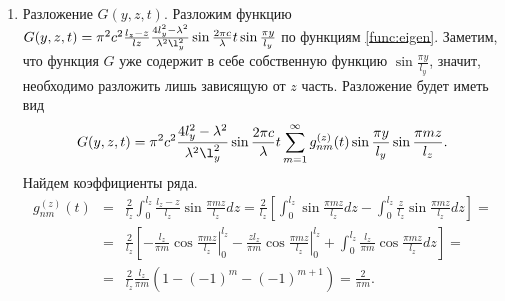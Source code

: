 \begin{enumerate}
\item Разложение $G(y, z, t)$.
  Разложим функцию $G(y, z, t) = \pi^2 c^2\frac{l_z - z}{lz}\frac{4l_y^2 - \lambda^2}{\lambda^2 \l_y^2}\sin\frac{2\pi c}{\lambda}t \sin\frac{\pi y}{l_y}$ по функциям \eqref{func:eigen}. Заметим, что функция $G$ уже содержит в себе собственную функцию $\sin\frac{\pi y}{l_y}$, значит, необходимо разложить лишь зависящую от $z$ часть. Разложение будет иметь вид
  \begin{equation}
    \label{func:G_represent}
    G(y, z, t) =  \pi^2 c^2 \frac{4l_y^2 - \lambda^2}{\lambda^2 \l_y^2} \sin\frac{2\pi c}{\lambda}t\displaystyle \sum_{m=1}^{\infty}  g_{nm}^{(z)}(t) \sin\frac{\pi y}{l_y} \sin\frac{\pi m z}{l_z}.
  \end{equation}
  Найдем коэффициенты ряда.
  \begin{eqnarray}
    \nonumber
    g^{(z)}_{nm}(t) &=& \frac{2}{l_z} \displaystyle \int_0^{l_z} \frac{l_z - z}{l_z} \sin\frac{\pi m z}{l_z} dz = \frac{2}{l_z}\left[\int_0^{l_z}\sin\frac{\pi m z}{l_z}dz - \int_0^{l_z}\frac{z}{l_z} \sin\frac{\pi m z}{l_z}dz\right] =\\
    \nonumber
    &=& \frac{2}{l_z} \left[ \left. -\frac{l_z}{\pi m} \cos\frac{\pi m z}{l_z}\right|_{0}^{l_z} - \left. \frac{z l_z}{\pi m}\cos\frac{\pi m z}{l_z}\right|_{0}^{l_z} + \int_0^{l_z}\frac{l_z}{\pi m}\cos\frac{\pi m z}{l_z}dz\right] =\\
    \label{func:g}
    &=& \frac{2}{l_z}\frac{l_z}{\pi m} \left( 1 - (-1)^m - (-1)^{m+1} \right) = \frac{2}{\pi m}.
  \end{eqnarray}
  

\end{enumerate}
